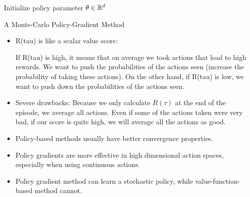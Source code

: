 \begin{refsection}
\begin{algorithm}
	Initialize policy parameter $\theta\in \mathbb{R}^d$\\
	\caption{A Monte-Carlo Policy-Gradient Method}
\end{algorithm}

\begin{remark}[interpretation]\hfill
	\begin{itemize}
		\item R(tau) is like a scalar value score:
		
		If R(tau) is high, it means that on average we took actions that lead to high rewards. We want to push the probabilities of the actions seen (increase the probability of taking these actions).
		On the other hand, if R(tau) is low, we want to push down the probabilities of the actions seen.
		
		\item Severe drawbacks: Because we only calculate $R(\tau)$ at the end of the episode, we average all actions. Even if some of the actions taken were very bad, if our score is quite high, we will average all the actions as good.
	\end{itemize}	
	
\end{remark}



\begin{remark}\hfill
	\begin{itemize}
		\item Policy-based methods usually have better convergence properties.
		\item Policy gradients are more effective in high dimensional action spaces, especially when using continuous actions.
		\item Policy gradient method can learn a stochastic policy, while value-function-based method cannot.
	\end{itemize}	
	

\end{remark}
\end{refsection}
